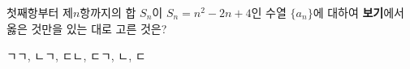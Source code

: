 첫째항부터 제$n$항까지의 합 $S_n$이 $S_n=n^2-2n+4$인 수열 $\{a_n\}$에 대하여 \textbf{보기}에서 옳은 것만을 있는 대로 고른 것은? 
\begin{choices32}{ㄱ}{ㄱ, ㄴ}{ㄱ, ㄷ}{ㄴ, ㄷ}{ㄱ, ㄴ, ㄷ}\end{choices32}
